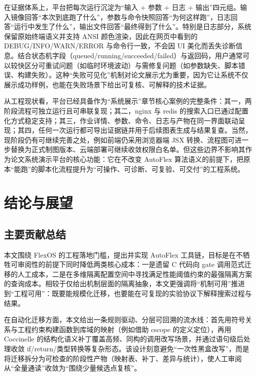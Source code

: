 \documentclass[UTF8,a4paper,12pt,twoside]{ctexart}  %
\begin{document}
在证据体系上，平台把每次运行沉淀为``输入 + 参数 + 日志 + 输出''四元组。输入镜像回答``本次到底跑了什么''，参数与命令快照回答``为何这样跑''，日志回答``运行中发生了什么''，输出文件回答``最终得到了什么''。特别是日志部分，系统保留原始终端语义并支持 ANSI
颜色渲染，因此在网页中看到的 DEBUG/INFO/WARN/ERROR 与命令行一致，不会因 UI
美化而丢失诊断信息。结合状态机字段（queued/running/succeeded/failed）与返回码，用户通常可以较快区分可重试问题（如临时环境波动）与需修复问题（如参数缺失、脚本错误、构建失败）。这种``失败可见化''机制对论文展示尤为重要，因为它让系统不仅展示成功样例，也能在失败场景下给出可复核、可解释的技术证据。

从工程现状看，平台已经具备作为``系统展示''章节核心案例的完整条件：其一，两阶段流程可独立运行且可串联复现；其二，nginx 与 redis 的搜索入口已通过配置化方式稳定支持；其三，作业详情、参数、命令、日志与产物在同一界面联动呈现；其四，任何一次运行都可导出证据链并用于后续图表生成与结果复查。当然，现阶段仍有可继续完善之处，例如前端仍采用浏览器端 JSX 转换、流程图可进一步替换为正式制图版本、云端部署可继续收敛权限白名单。但这些边界不影响其作为论文系统演示平台的核心功能：它在不改变 AutoFlex
算法语义的前提下，把原本``能跑''的脚本化流程提升为``可操作、可诊断、可复验、可交付''的工程系统。

\cleardoublepage
\section{结论与展望}

\subsection{主要贡献总结}

本文围绕 FlexOS 的工程落地门槛，提出并实现 AutoFlex 工具链，目标是在不牺牲可审阅性的前提下同时降低两类核心成本：一是遗留 C 代码向 gate 调用范式迁移的人工成本，二是在多维隔离配置空间中寻找满足性能阈值约束的最强隔离方案的查询成本。相较于仅给出机制层面的隔离抽象，本文更强调将``机制可用''推进到``工程可用''：既要能规模化迁移，也要能在可复现的实验协议下解释搜索过程与结果。

在自动化迁移方面，本文给出一条规则驱动、分层可回溯的流水线：首先用符号关系与工程约束构建函数到库域的映射（例如借助 cscope\cite{14} 的定义定位），再用 Coccinelle 的结构化语义补丁\cite{10,26}覆盖高频、同构的调用改写场景，并通过语句级后处理收敛 if/return/类型转换等复杂形态。该设计刻意避免``一次性黑盒改写''，而是将迁移拆分为可检查的阶段性产物（映射表、补丁、差异与统计），使人工审阅从``全量通读''收敛为``围绕少量候选点复核''。
\end{document}
